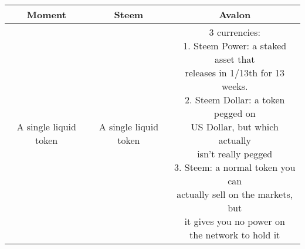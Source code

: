 \documentclass[a4paper]{article}
\begin{document}
\begin{center}
\begin{tabular}{|c|c|c|}
 \hline
 Moment & Steem & Avalon \\ \hline
    A single liquid token 
    & 
    A single liquid token 
    &
    \makecell{3 currencies:\\
        1. Steem Power: a staked asset that\\ releases in 1/13th for 13 weeks. \\
        2. Steem Dollar: a token pegged on\\ US Dollar, but which actually \\ 
        isn’t really pegged \\
        3. Steem: a normal token you can\\ actually sell on the markets, but \\
        it gives you no power on\\ the network to hold it} \\ \hline  
        

\end{tabular}
\end{center}
\end{document}
